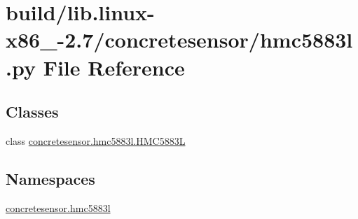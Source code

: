 \hypertarget{build_2lib_8linux-x86__64-2_87_2concretesensor_2hmc5883l_8py}{}\section{build/lib.linux-\/x86\+\_-\/2.7/concretesensor/hmc5883l.py File Reference}
\label{build_2lib_8linux-x86__64-2_87_2concretesensor_2hmc5883l_8py}
\subsection*{Classes}
\begin{DoxyCompactItemize}
\item 
class \hyperlink{classconcretesensor_1_1hmc5883l_1_1HMC5883L}{concretesensor.\+hmc5883l.\+H\+M\+C5883\+L}
\end{DoxyCompactItemize}
\subsection*{Namespaces}
\begin{DoxyCompactItemize}
\item 
 \hyperlink{namespaceconcretesensor_1_1hmc5883l}{concretesensor.\+hmc5883l}
\end{DoxyCompactItemize}
